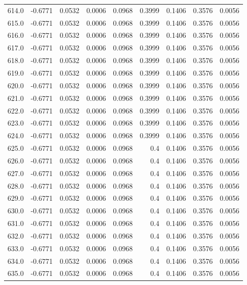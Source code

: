 \begin{longtable}{lrrrrrrrr}
614.0 & -0.6771 & 0.0532 & 0.0006 & 0.0968 & 0.3999 & 0.1406 & 0.3576 & 0.0056 \\
615.0 & -0.6771 & 0.0532 & 0.0006 & 0.0968 & 0.3999 & 0.1406 & 0.3576 & 0.0056 \\
616.0 & -0.6771 & 0.0532 & 0.0006 & 0.0968 & 0.3999 & 0.1406 & 0.3576 & 0.0056 \\
617.0 & -0.6771 & 0.0532 & 0.0006 & 0.0968 & 0.3999 & 0.1406 & 0.3576 & 0.0056 \\
618.0 & -0.6771 & 0.0532 & 0.0006 & 0.0968 & 0.3999 & 0.1406 & 0.3576 & 0.0056 \\
619.0 & -0.6771 & 0.0532 & 0.0006 & 0.0968 & 0.3999 & 0.1406 & 0.3576 & 0.0056 \\
620.0 & -0.6771 & 0.0532 & 0.0006 & 0.0968 & 0.3999 & 0.1406 & 0.3576 & 0.0056 \\
621.0 & -0.6771 & 0.0532 & 0.0006 & 0.0968 & 0.3999 & 0.1406 & 0.3576 & 0.0056 \\
622.0 & -0.6771 & 0.0532 & 0.0006 & 0.0968 & 0.3999 & 0.1406 & 0.3576 & 0.0056 \\
623.0 & -0.6771 & 0.0532 & 0.0006 & 0.0968 & 0.3999 & 0.1406 & 0.3576 & 0.0056 \\
624.0 & -0.6771 & 0.0532 & 0.0006 & 0.0968 & 0.3999 & 0.1406 & 0.3576 & 0.0056 \\
625.0 & -0.6771 & 0.0532 & 0.0006 & 0.0968 & 0.4 & 0.1406 & 0.3576 & 0.0056 \\
626.0 & -0.6771 & 0.0532 & 0.0006 & 0.0968 & 0.4 & 0.1406 & 0.3576 & 0.0056 \\
627.0 & -0.6771 & 0.0532 & 0.0006 & 0.0968 & 0.4 & 0.1406 & 0.3576 & 0.0056 \\
628.0 & -0.6771 & 0.0532 & 0.0006 & 0.0968 & 0.4 & 0.1406 & 0.3576 & 0.0056 \\
629.0 & -0.6771 & 0.0532 & 0.0006 & 0.0968 & 0.4 & 0.1406 & 0.3576 & 0.0056 \\
630.0 & -0.6771 & 0.0532 & 0.0006 & 0.0968 & 0.4 & 0.1406 & 0.3576 & 0.0056 \\
631.0 & -0.6771 & 0.0532 & 0.0006 & 0.0968 & 0.4 & 0.1406 & 0.3576 & 0.0056 \\
632.0 & -0.6771 & 0.0532 & 0.0006 & 0.0968 & 0.4 & 0.1406 & 0.3576 & 0.0056 \\
633.0 & -0.6771 & 0.0532 & 0.0006 & 0.0968 & 0.4 & 0.1406 & 0.3576 & 0.0056 \\
634.0 & -0.6771 & 0.0532 & 0.0006 & 0.0968 & 0.4 & 0.1406 & 0.3576 & 0.0056 \\
635.0 & -0.6771 & 0.0532 & 0.0006 & 0.0968 & 0.4 & 0.1406 & 0.3576 & 0.0056 \\

\end{longtable}

